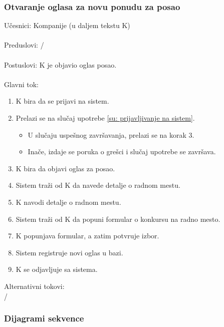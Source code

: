 \subsubsection{Otvaranje oglasa za novu ponudu za posao}
\label{su: otvaranje oglasa za novu ponudu za posao}

\noindent U\v cesnici: Kompanije (u daljem tekstu K)
\\
\\ Preduslovi: /
\\
\\ Postuslovi: K je objavio oglas posao.
\\ 
\\ Glavni tok:
\begin{enumerate}
	\item K bira da se prijavi na sistem.
	\item Prelazi se na slu\v caj upotrebe \ref{su: prijavljivanje na sistem}.
	\begin{itemize}
		\item U slu\v caju uspe\v snog zavr\v savanja, prelazi se na korak 3.
		\item Ina\v ce, izdaje se poruka o gre\v sci i slu\v caj upotrebe se zavr\v sava.
	\end{itemize}
	\item K bira da objavi oglas za posao.
	\item Sistem tra\v zi od K da navede detalje o radnom mestu.
	\item K navodi detalje o radnom mestu.
	\item Sistem tra\v zi od K da popuni formular o konkursu na radno mesto.
	\item K popunjava formular, a zatim potvr\dj uje izbor.
	\item Sistem registruje novi oglas u bazi.
	\item K se odjavljuje sa sistema.
\end{enumerate}

\noindent Alternativni tokovi: 
\\/

\subsubsection{Dijagrami sekvence}

